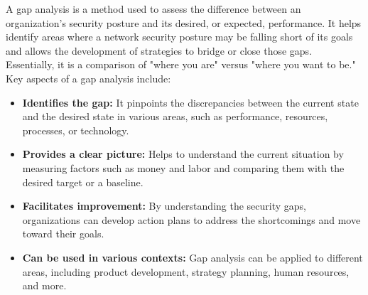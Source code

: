  A gap analysis is a method used to assess the difference between an organization's security posture and its desired, or expected, performance. It helps identify areas where a network security posture may be falling short of its goals and allows the development of strategies to bridge or close those gaps. Essentially, it is a comparison of "where you are" versus "where you want to be." 
Key aspects of a gap analysis include:
\begin{itemize}
    \item \textbf{Identifies the gap:} It pinpoints the discrepancies between the current state and the desired state in various areas, such as performance, resources, processes, or technology.
    \item \textbf{Provides a clear picture:} Helps to understand the current situation by measuring factors such as money and labor and comparing them with the desired target or a baseline.
    \item \textbf{Facilitates improvement:} By understanding the security gaps, organizations can develop action plans to address the shortcomings and move toward their goals.
    \item \textbf{Can be used in various contexts:} Gap analysis can be applied to different areas, including product development, strategy planning, human resources, and more.
\end{itemize}

